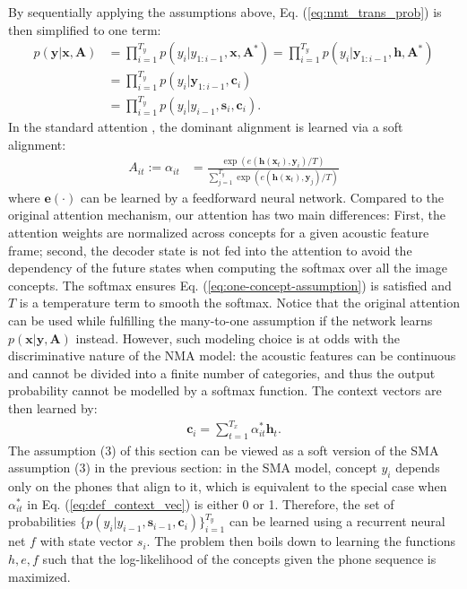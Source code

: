 \documentclass[journal]{IEEEtran}
\begin{document}
By sequentially applying the assumptions above, Eq. (\ref{eq:nmt_trans_prob}) is then simplified to one term:
\begin{align}\label{eq:nmt_trans_prob_simplify}
    p(\mathbf y|\mathbf x, \mathbf A)&= \prod_{i=1}^{T_y} p(y_i|y_{1:i-1}, \mathbf{x}, \mathbf{A}^*) = \prod_{i=1}^{T_y} p(y_i|\mathbf y_{1:i-1}, \mathbf h, \mathbf{A}^*)\\
    &= \prod_{i=1}^{T_y} p(y_i|\mathbf y_{1:i-1}, \mathbf c_i)\\
    &= \prod_{i=1}^{T_y} p(y_i|y_{i-1}, \mathbf s_i, \mathbf c_i).
\end{align}
In the standard attention \cite{Bahdanau14}, the dominant alignment is learned via a soft alignment:
\begin{align}\label{eq:def_soft_align}
    A_{it}:= \alpha_{it} &= \frac{\exp(e(\mathbf h(\mathbf x_t), \mathbf y_i)/T)}{\sum_{j=1}^{T_y} \exp(e(\mathbf h(\mathbf{x}_t), \mathbf y_j)/T)}
\end{align}
where $\mathbf e(\cdot)$ can be learned by a feedforward neural network. Compared to the original attention mechanism, our attention has two main differences: First, the attention weights are normalized across concepts for a given acoustic feature frame; second, the decoder state is not fed into the attention to avoid the dependency of the future states when computing the softmax over all the image concepts. The softmax ensures Eq. (\ref{eq:one-concept-assumption}) is satisfied and $T$ is a temperature term to smooth the softmax. Notice that the original attention can be used while fulfilling the many-to-one assumption if the network learns $p(\mathbf x|\mathbf y, \mathbf A)$ instead. However, such modeling choice is at odds with the discriminative nature of the NMA model: the acoustic features can be  continuous and cannot be divided into a finite number of categories, and thus the output probability cannot be modelled by a softmax function. The context vectors are then learned by:
\begin{align}\label{eq:def_context_vec}
    \mathbf c_i = \sum_{t=1}^{T_x} \alpha_{it}^* \mathbf h_t.
\end{align}
The assumption (3) of this section can be viewed as a soft version of the SMA assumption (3) in the previous section:  in the SMA model, concept $y_i$ depends only on the phones that align to it, which is equivalent to the special case when $\alpha_{it}^*$ in Eq. (\ref{eq:def_context_vec}) is either 0 or 1. Therefore, the set of probabilities $\{p(y_i|y_{i-1}, \mathbf s_{i-1}, \mathbf c_i)\}_{i=1}^{T_y}$ can be learned using a recurrent neural net $f$ with state vector $s_i$. The problem then boils down to learning the functions $h, e, f$ such that the log-likelihood of the concepts given the phone sequence is maximized.
\end{document}
